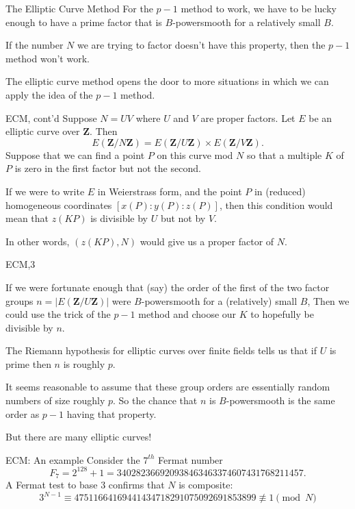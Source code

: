 \documentclass{beamer}
\begin{document}
\begin{frame}{The Elliptic Curve Method}
	For the $p-1$ method to work, we have to be lucky enough to have a prime factor that is $B$-powersmooth for a relatively small $B$.

        \bigskip\noindent
	If the number $N$ we are trying to factor doesn't have this property, then the $p-1$ method won't work.


        \bigskip\noindent
	The elliptic curve method opens the door to more situations in which we can apply the idea of the $p-1$ method.
\end{frame}
\begin{frame}{ECM, cont'd}
	Suppose $N=UV$ where $U$ and $V$ are proper factors.  Let $E$ be an elliptic curve over $\mathbf{Z}$.  Then 
	$$
	E(\mathbf{Z}/N\mathbf{Z})=E(\mathbf{Z}/U\mathbf{Z})\times E(\mathbf{Z}/V\mathbf{Z}).
	$$
	Suppose that we can find a point $P$ on this curve mod $N$ so that a multiple $K$ of $P$ is zero in the first factor but not the second.
	
	\bigskip\noindent
	If we were to write $E$ in Weierstrass form, and the point $P$ in (reduced) homogeneous coordinates $[x(P):y(P):z(P)]$, then this condition
	would mean that $z(KP)$ is divisible by $U$ but not by $V$.  
	
	\bigskip\noindent
	In other words, $(z(KP),N)$ would give us a proper factor of $N$.
\end{frame}
\begin{frame}{ECM,3}

	If we were fortunate enough that (say) the order of the  first of the two factor groups
	$n=|E(\mathbf{Z}/U\mathbf{Z})|$ were $B$-powersmooth for a (relatively) small $B$,
	Then we could use the trick of the $p-1$ method and choose our $K$ to hopefully be divisible by $n$.

        \bigskip\noindent
	The Riemann hypothesis for elliptic curves over finite fields tells us that if $U$ is prime then $n$ is roughly $p$.

        \bigskip\noindent
        It seems reasonable to assume that these group orders are essentially random numbers of size roughly $p$.
	So the chance that $n$ is $B$-powersmooth is the same order as $p-1$ having that property.

        \bigskip\noindent
	But there are many elliptic curves! 
\end{frame}
\begin{frame}{ECM: An example}
Consider the $7^{th}$ Fermat number 
$$
F_{7}=2^{128}+1=340282366920938463463374607431768211457.
$$
A Fermat test to base $3$ confirms that $N$ is composite:
$$
3^{N-1}\equiv 47511664169441434718291075092691853899\not\equiv 1\pmod{N}
$$
\end{frame}
\end{document}
